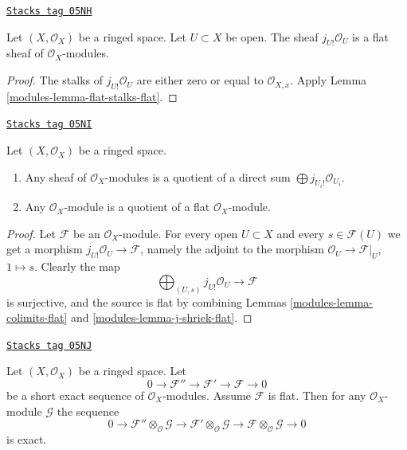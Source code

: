 \begin{lemma}
\label{modules-lemma-j-shriek-flat}
\href{https://stacks.math.columbia.edu/tag/05NH}{\texttt{Stacks tag 05NH}}

Let $(X, \mathcal{O}_X)$ be a ringed space.
Let $U \subset X$ be open. The sheaf $j_{U!}\mathcal{O}_U$
is a flat sheaf of $\mathcal{O}_X$-modules.
\end{lemma}

\begin{proof}

The stalks of $j_{U!}\mathcal{O}_U$ are either zero or equal
to $\mathcal{O}_{X, x}$. Apply
Lemma \ref{modules-lemma-flat-stalks-flat}.
\end{proof}

\begin{lemma}
\label{modules-lemma-module-quotient-flat}
\href{https://stacks.math.columbia.edu/tag/05NI}{\texttt{Stacks tag 05NI}}

Let $(X, \mathcal{O}_X)$ be a ringed space.
\begin{enumerate}
\item Any sheaf of $\mathcal{O}_X$-modules is a quotient of
a direct sum $\bigoplus j_{U_i!}\mathcal{O}_{U_i}$.
\item Any $\mathcal{O}_X$-module is a quotient of
a flat $\mathcal{O}_X$-module.
\end{enumerate}
\end{lemma}

\begin{proof}

Let $\mathcal{F}$ be an $\mathcal{O}_X$-module.
For every open $U \subset X$ and every
$s \in \mathcal{F}(U)$ we get a morphism
$j_{U!}\mathcal{O}_U \to \mathcal{F}$, namely the adjoint to
the morphism $\mathcal{O}_U \to \mathcal{F}|_U$, $1 \mapsto s$.
Clearly the map
$$
\bigoplus\nolimits_{(U, s)} j_{U!}\mathcal{O}_U
\longrightarrow
\mathcal{F}
$$
is surjective, and the source is flat by combining Lemmas
\ref{modules-lemma-colimits-flat} and \ref{modules-lemma-j-shriek-flat}.
\end{proof}

\begin{lemma}
\label{modules-lemma-flat-tor-zero}
\href{https://stacks.math.columbia.edu/tag/05NJ}{\texttt{Stacks tag 05NJ}}

Let $(X, \mathcal{O}_X)$ be a ringed space.
Let
$$
0 \to \mathcal{F}'' \to \mathcal{F}' \to \mathcal{F} \to 0
$$
be a short exact sequence of $\mathcal{O}_X$-modules.
Assume $\mathcal{F}$ is flat. Then for any $\mathcal{O}_X$-module
$\mathcal{G}$ the sequence
$$
0 \to
\mathcal{F}'' \otimes_\mathcal{O} \mathcal{G} \to
\mathcal{F}' \otimes_\mathcal{O} \mathcal{G} \to
\mathcal{F} \otimes_\mathcal{O} \mathcal{G} \to 0
$$
is exact.
\end{lemma}

